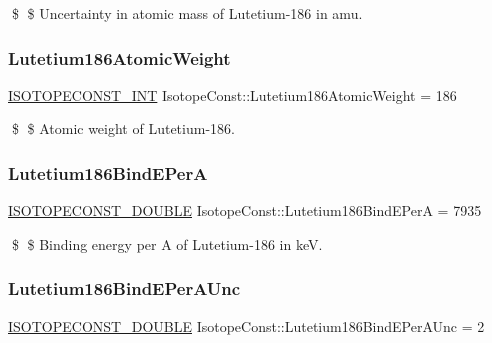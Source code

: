 \$ \$ Uncertainty in atomic mass of Lutetium-\/186 in amu. \mbox{\label{group___isotope_const-_lutetium-_lu186_ga2f85d48e51a560d43a44b628db7eadae}} 
\subsubsection{\texorpdfstring{Lutetium186\+Atomic\+Weight}{Lutetium186AtomicWeight}}
{\footnotesize\ttfamily \mbox{\hyperlink{group___isotope_const-_macros_ga5f18360b3e99483a35c32d789e62621c}{I\+S\+O\+T\+O\+P\+E\+C\+O\+N\+S\+T\+\_\+\+I\+NT}} Isotope\+Const\+::\+Lutetium186\+Atomic\+Weight = 186}

\$ \$ Atomic weight of Lutetium-\/186. \mbox{\label{group___isotope_const-_lutetium-_lu186_gab1cf0668c3d8ec395f9989dd304d9f2a}} 
\subsubsection{\texorpdfstring{Lutetium186\+Bind\+E\+PerA}{Lutetium186BindEPerA}}
{\footnotesize\ttfamily \mbox{\hyperlink{group___isotope_const-_macros_ga8f45a7272ce02c0b4c65c44636ed719a}{I\+S\+O\+T\+O\+P\+E\+C\+O\+N\+S\+T\+\_\+\+D\+O\+U\+B\+LE}} Isotope\+Const\+::\+Lutetium186\+Bind\+E\+PerA = 7935}

\$ \$ Binding energy per A of Lutetium-\/186 in keV. \mbox{\label{group___isotope_const-_lutetium-_lu186_ga79e0b36359e19bee8946f09a5c21510e}} 
\subsubsection{\texorpdfstring{Lutetium186\+Bind\+E\+Per\+A\+Unc}{Lutetium186BindEPerAUnc}}
{\footnotesize\ttfamily \mbox{\hyperlink{group___isotope_const-_macros_ga8f45a7272ce02c0b4c65c44636ed719a}{I\+S\+O\+T\+O\+P\+E\+C\+O\+N\+S\+T\+\_\+\+D\+O\+U\+B\+LE}} Isotope\+Const\+::\+Lutetium186\+Bind\+E\+Per\+A\+Unc = 2}

